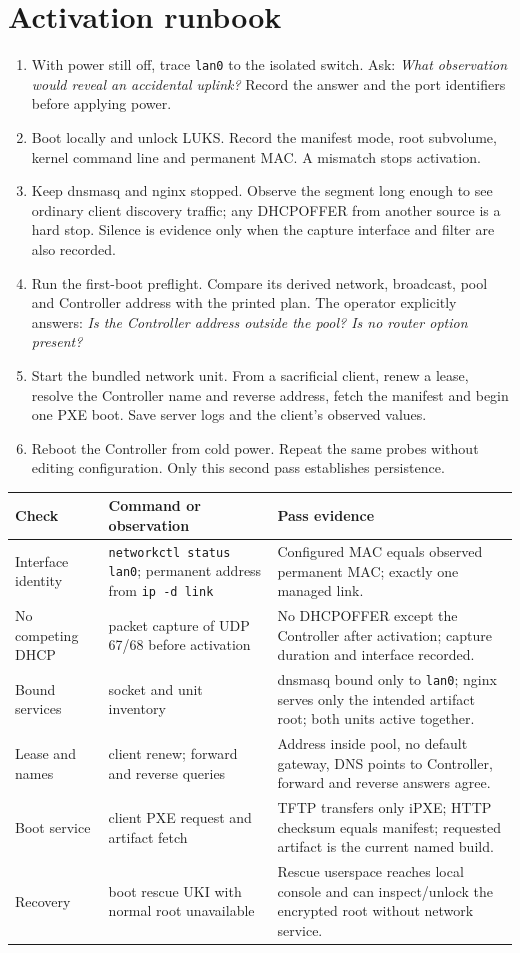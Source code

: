 \section{Activation runbook}
\begin{enumerate}
\item With power still off, trace \texttt{lan0} to the isolated switch. Ask:
\emph{What observation would reveal an accidental uplink?} Record the answer
and the port identifiers before applying power.
\item Boot locally and unlock LUKS. Record the manifest mode, root subvolume,
kernel command line and permanent MAC. A mismatch stops activation.
\item Keep dnsmasq and nginx stopped. Observe the segment long enough to see
ordinary client discovery traffic; any DHCPOFFER from another source is a hard
stop. Silence is evidence only when the capture interface and filter are also
recorded.
\item Run the first-boot preflight. Compare its derived network, broadcast,
pool and Controller address with the printed plan. The operator explicitly
answers: \emph{Is the Controller address outside the pool? Is no router option
present?}
\item Start the bundled network unit. From a sacrificial client, renew a lease,
resolve the Controller name and reverse address, fetch the manifest and begin
one PXE boot. Save server logs and the client's observed values.
\item Reboot the Controller from cold power. Repeat the same probes without
editing configuration. Only this second pass establishes persistence.
\end{enumerate}

\begin{tabularx}{\linewidth}{@{}p{.22\linewidth}p{.27\linewidth}L@{}}
\toprule
\textbf{Check} & \textbf{Command or observation} & \textbf{Pass evidence}\\
\midrule
Interface identity & \texttt{networkctl status lan0}; permanent address from \texttt{ip -d link} & Configured MAC equals observed permanent MAC; exactly one managed link.\\
No competing DHCP & packet capture of UDP 67/68 before activation & No DHCPOFFER except the Controller after activation; capture duration and interface recorded.\\
Bound services & socket and unit inventory & dnsmasq bound only to \texttt{lan0}; nginx serves only the intended artifact root; both units active together.\\
Lease and names & client renew; forward and reverse queries & Address inside pool, no default gateway, DNS points to Controller, forward and reverse answers agree.\\
Boot service & client PXE request and artifact fetch & TFTP transfers only iPXE; HTTP checksum equals manifest; requested artifact is the current named build.\\
Recovery & boot rescue UKI with normal root unavailable & Rescue userspace reaches local console and can inspect/unlock the encrypted root without network service.\\
\bottomrule
\end{tabularx}

